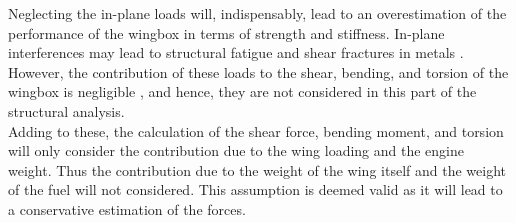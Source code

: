 \noindent Neglecting the in-plane loads will, indispensably, lead to an overestimation of the performance of the wingbox in terms of strength and stiffness. In-plane interferences may lead to structural fatigue and shear fractures in metals \cite{Yin2015AMaterials}. However, the contribution of these loads to the shear, bending, and torsion of the wingbox is negligible \cite{Timmer2024AE2111-IReader}, and hence, they are not considered in this part of the structural analysis.\\

\noindent Adding to these, the calculation of the shear force, bending moment, and torsion will only consider the contribution due to the wing loading and the engine weight. Thus the contribution due to the weight of the wing itself and the weight of the fuel will not considered. This assumption is deemed valid as it will lead to a conservative estimation of the forces.















